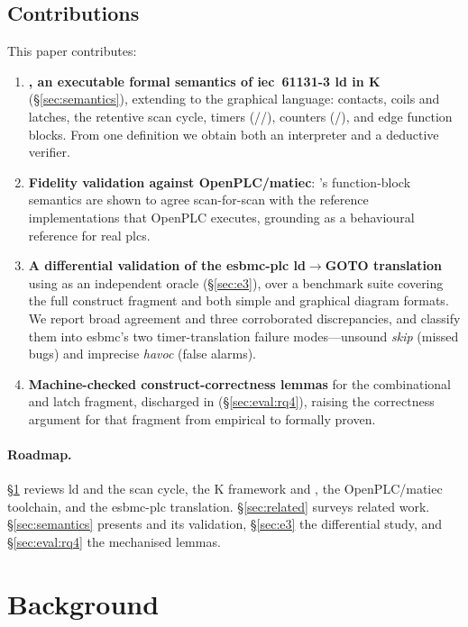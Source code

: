 \subsection{Contributions}
\label{sub:contributions}
This paper contributes:
\begin{enumerate}
  \item \textbf{\kld{}, an executable formal semantics of \gls{iec}~61131-3
    \gls{ld} in \textsf{K}} (\S\ref{sec:semantics}), extending \kst{} to the
    graphical language: contacts, coils and latches, the retentive scan cycle,
    timers (//), counters (/),
    and edge function blocks. From one definition we obtain both an interpreter
    and a deductive verifier.
  \item \textbf{Fidelity validation against OpenPLC/\gls{matiec}}: \kld{}'s
    function-block semantics are shown to agree scan-for-scan with the reference
    implementations that OpenPLC executes, grounding \kld{} as a behavioural
    reference for real \gls{plc}s.
  \item \textbf{A differential validation of the \gls{esbmc}-\gls{plc}
    \gls{ld}$\rightarrow$GOTO translation} using \kld{} as an independent oracle
    (\S\ref{sec:e3}), over a benchmark suite covering the full construct fragment
    and both simple and graphical diagram formats. We report broad agreement and
    three corroborated discrepancies, and classify them into \gls{esbmc}'s two
    timer-translation failure modes---unsound \emph{skip} (missed bugs) and
    imprecise \emph{havoc} (false alarms).
  \item \textbf{Machine-checked construct-correctness lemmas} for the
    combinational and latch fragment, discharged in 
    (\S\ref{sec:eval:rq4}), raising the correctness argument for that fragment
    from empirical to formally proven.
\end{enumerate}

\paragraph{Roadmap.} \S\ref{sec:background} reviews \gls{ld} and the scan cycle,
the \textsf{K} framework and \kst{}, the OpenPLC/\gls{matiec} toolchain, and the
\gls{esbmc}-\gls{plc} translation. \S\ref{sec:related} surveys related work.
\S\ref{sec:semantics} presents \kld{} and its validation, \S\ref{sec:e3} the
differential study, and \S\ref{sec:eval:rq4} the mechanised lemmas.

\section{Background}
\label{sec:background}

